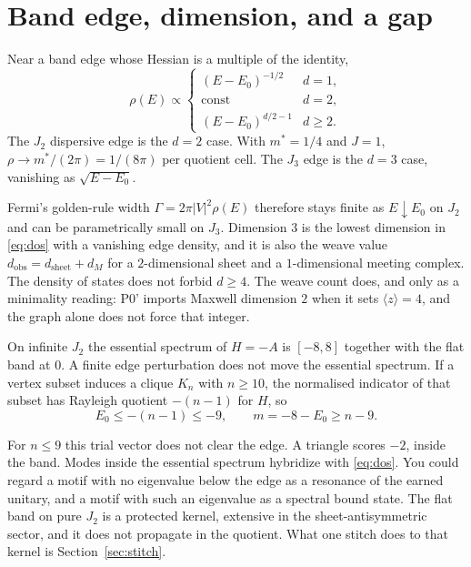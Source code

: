 \section{Band edge, dimension, and a gap}
\label{sec:dos}

Near a band edge whose Hessian is a multiple of the identity,
\begin{equation}
\label{eq:dos}
\rho(E)\propto
\begin{cases}
(E-E_0)^{-1/2}& d=1,\\
\mathrm{const}& d=2,\\
(E-E_0)^{d/2-1}& d\ge 2.
\end{cases}
\end{equation}
The \(J_2\) dispersive edge is the \(d=2\) case.
With \(m^*=1/4\) and \(J=1\),
\(\rho\to m^*/(2\pi)=1/(8\pi)\) per quotient cell.
The \(J_3\) edge is the \(d=3\) case, vanishing as \(\sqrt{E-E_0}\).

Fermi's golden-rule width \(\Gamma=2\pi|V|^2\rho(E)\) therefore stays finite
as \(E\downarrow E_0\) on \(J_2\) and can be parametrically small on \(J_3\).
Dimension \(3\) is the lowest dimension in \eqref{eq:dos} with a vanishing
edge density, and it is also the weave value
\(d_{\mathrm{obs}}=d_{\mathrm{sheet}}+d_M\) for a \(2\)-dimensional sheet
and a \(1\)-dimensional meeting complex.
The density of states does not forbid \(d\ge 4\).
The weave count does, and only as a minimality reading:
P0' imports Maxwell dimension \(2\) when it sets \(\langle z\rangle=4\),
and the graph alone does not force that integer.

\begin{proposition}
\label{prop:clique}
On infinite \(J_2\) the essential spectrum of \(H=-A\) is \([-8,8]\) together
with the flat band at \(0\).
A finite edge perturbation does not move the essential spectrum.
If a vertex subset induces a clique \(K_n\) with \(n\ge 10\),
the normalised indicator of that subset has Rayleigh quotient \(-(n-1)\)
for \(H\), so
\[
E_0\le -(n-1)\le -9,\qquad m=-8-E_0\ge n-9.
\]
\end{proposition}

For \(n\le 9\) this trial vector does not clear the edge.
A triangle scores \(-2\), inside the band.
Modes inside the essential spectrum hybridize with \eqref{eq:dos}.
You could regard a motif with no eigenvalue below the edge as a resonance
of the earned unitary, and a motif with such an eigenvalue as a spectral
bound state.
The flat band on pure \(J_2\) is a protected kernel, extensive in the
sheet-antisymmetric sector, and it does not propagate in the quotient.
What one stitch does to that kernel is Section~\ref{sec:stitch}.

